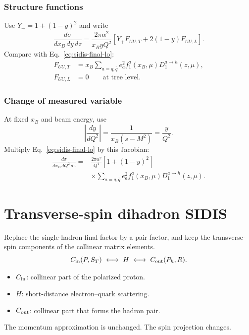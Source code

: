 \documentclass[14pt,a4paper]{extarticle}
\numberwithin{equation}{section}
\begin{document}
\subsubsection{Structure functions}
Use $Y_+=1+(1-y)^2$ and write
\begin{equation}
 \frac{d\sigma}{dx_B\,dy\,dz}
 =\frac{2\pi\alpha^2}{x_ByQ^2}
 [Y_+F_{UU,T}+2(1-y)F_{UU,L}].
 \label{eq:sidis-structure-cross-section}
\end{equation}
Compare with Eq.~\eqref{eq:sidis-final-lo}:
\begin{align}
 F_{UU,T}&=x_B\sum_{a=q,\bar q}e_a^2
 f_1^a(x_B,\mu)D_1^{a\to h}(z,\mu),\\
 F_{UU,L}&=0\qquad\text{at tree level}.
 \label{eq:sidis-structure-lo}
\end{align}


\subsubsection{Change of measured variable}
At fixed $x_B$ and beam energy, use
\begin{equation}
 \left|\frac{dy}{dQ^2}\right|
 =\frac1{x_B(s-M^2)}=\frac{y}{Q^2}.
\end{equation}
Multiply Eq.~\eqref{eq:sidis-final-lo} by this Jacobian:
\begin{equation}
 \boxed{\begin{aligned}
 \frac{d\sigma}{dx_B\,dQ^2\,dz}
 ={}&\frac{2\pi\alpha^2}{Q^4}[1+(1-y)^2]\\
 &\times\sum_{a=q,\bar q}e_a^2
 f_1^a(x_B,\mu)D_1^{a\to h}(z,\mu).
 \end{aligned}}
 \label{eq:sidis-Q2-cross-section}
\end{equation}

\clearpage
\section{Transverse-spin dihadron SIDIS}
\label{sec:dihadron}
Replace the single-hadron final factor by a pair factor, and keep the
transverse-spin components of the collinear matrix elements.
\begin{equation}
 C_{\rm in}(P,S_T)\ \longleftrightarrow\ H
 \ \longleftrightarrow\ C_{\rm out}(P_h,R).
\end{equation}
\begin{itemize}
 \item $C_{\rm in}$: collinear part of the polarized proton.
 \item $H$: short-distance electron--quark scattering.
 \item $C_{\rm out}$: collinear part that forms the hadron pair.
\end{itemize}
The momentum approximation is unchanged. The spin projection changes.
\end{document}
